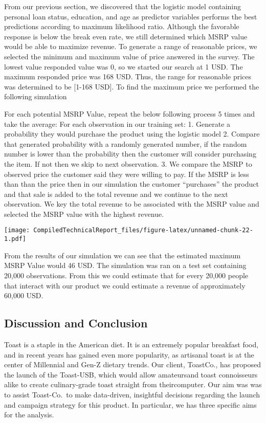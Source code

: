 \documentclass[]{article}
\begin{document}
From our previous section, we discovered that the logistic model
containing personal loan status, education, and age as predictor
variables performs the best predictions according to maximum likelihood
ratio. Although the favorable response is below the break even rate, we
still determined which MSRP value would be able to maximize revenue. To
generate a range of reasonable prices, we selected the minimum and
maximum value of price answered in the survey. The lowest value
responded value was 0, so we started our search at 1 USD. The maximum
responded price was 168 USD. Thus, the range for reasonable prices was
determined to be {[}1-168 USD{]}. To find the maximum price we performed
the following simulation

For each potential MSRP Value, repeat the below following process 5
times and take the average: For each observation in our training set: 1.
Generate a probability they would purchase the product using the
logistic model 2. Compare that generated probability with a randomly
generated number, if the random number is lower than the probability
then the customer will consider purchasing the item. If not then we skip
to next observation. 3. We compare the MSRP to observed price the
customer said they were willing to pay. If the MSRP is less than than
the price then in our simulation the customer ``purchases'' the product
and that sale is added to the total revenue and we continue to the next
observation. We key the total revenue to be associated with the MSRP
value and selected the MSRP value with the highest revenue.

\texttt{[image: CompiledTechnicalReport\_files/figure-latex/unnamed-chunk-22-1.pdf]}

From the results of our simulation we can see that the estimated maximum
MSRP Value would 46 USD. The simulation was ran on a test set containing
20,000 observations. From this we could estimate that for every 20,000
people that interact with our product we could estimate a revenue of
approximately 60,000 USD.

\hypertarget{discussion-and-conclusion}{%
\subsection{Discussion and Conclusion}\label{discussion-and-conclusion}}

Toast is a staple in the American diet. It is an extremely popular
breakfast food, and in recent years has gained even more popularity, as
artisanal toast is at the center of Millennial and Gen-Z dietary trends.
Our client, ToastCo., has proposed the launch of the Toast-USB, which
would allow amateursand toast connoisseurs alike to create
culinary-grade toast straight from theircomputer. Our aim was was to
assist Toast-Co.~to make data-driven, insightful decisions regarding the
launch and campaign strategy for this product. In particular, we has
three specific aims for the analysis.
\end{document}
